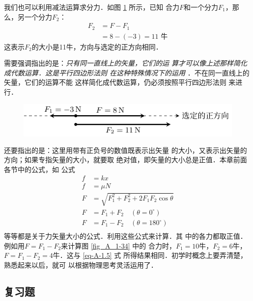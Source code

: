     我们也可以利用减法运算求分力．如图 \ref{fig_A_1-35} 所示，已知
合力$F$和一个分力$F_1$，那么，另一个分力$F_2$：
\begin{equation} 
\begin{split} 
F_2&=F-F_1\\
&=8-(-3)=11\text{ 牛} 
\end{split} 
\end{equation} 
这表示$F_2$的大小是11牛，方向与选定的正方向相同．

需要强调指出的是：\textit{只有同一直线上的矢量，它们的运
算才可以像上述那样简化成代数运算．这是平行四边形法则
在这种特殊情况下的运用} ．不在同一直线上的矢量，它们的运算不能
这样简化成代数运算，仍必须按照平行四边形法则
来进行．

\begin{figure} [htp]
\centering
\includegraphics{fig/A/1-35.pdf} 
\caption{} \label{fig_A_1-35} 
\end{figure} 

    还要指出的是：这里用带有正负号的数值既表示出矢量
的大小，又表示出矢量的方向；如果专指矢量的大小，就要取
绝对值，即矢量的大小总是正值．本章前面各节中的公式，如
公式
\[\begin{split} 
f&=kx\\
f&=\mu N\\
F&=\sqrt{F^2_1+F^2_2+2F_1F_2\cos\theta} \\
F&=F_1+F_2\quad (\theta =0^\circ)\\
F&=F_1-F_2\quad (\theta =180^\circ)\\
\end{split}  \]
等等都是关于力矢量大小的公式．利用这些公式来计算．其
中的各力都取正值．例如用$F=F_1-F_2$来计算图 \ref{fig_A_1-34} 中的
合力时，$F_1=10$牛，$F_2=6$牛，$F=F_1-F_2=4$牛．这与 \ref{eq-A-1.5} 式
所得结果相同．初学时概念上要弄清楚，熟悉起来以后，就可
以根据物理思考灵活运用了．


\subsection*{复习题} 

